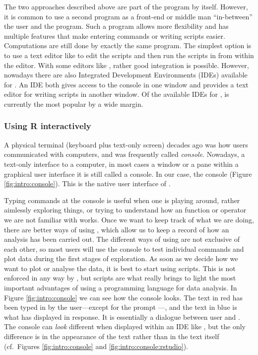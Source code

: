 \documentclass[krantz2]{krantz}\usepackage{knitr}%
\begin{document}
The two approaches described above are part of the \Rpgrm program by itself. However, it is common to use a second program as a front-end or middle man ``in-between'' the user and the \Rpgrm program. Such a program allows more flexibility and has multiple features that make entering commands or writing scripts easier. Computations are still done by exactly the same \Rpgrm program. The simplest option is to use a text editor like  to edit the scripts and then run the scripts in \Rpgrm from within the editor. With some editors like , rather good integration is possible. However, nowadays there are also Integrated Development Environments (IDEs) available for \Rpgrm. An IDE both gives access to the \Rpgrm console in one window and provides a text editor for writing scripts in another window. Of the available IDEs for \Rpgrm, \RStudio is currently the most popular by a wide margin.

\subsubsection{Using R interactively}

A physical terminal (keyboard plus text-only screen) decades ago was how users communicated with computers, and was frequently called \emph{console}. Nowadays, a text-only interface to a computer, in most cases a window or a pane within a graphical user interface it is still called a console. In our case, the \Rpgrm console (Figure \ref{fig:intro:console}). This is the native user interface of \Rpgrm.

Typing commands at the \Rpgrm console is useful when one is playing around, rather aimlessly exploring things, or trying to understand how an \Rpgrm function or operator we are not familiar with works. Once we want to keep track of what we are doing, there are better ways of using \Rpgrm, which allow us to keep a record of how an analysis has been carried out. The different ways of using \Rpgrm are not exclusive of each other, so most users will use the \Rpgrm console to test individual commands and plot data during the first stages of exploration. As soon as we decide how we want to plot or analyse the data, it is best to start using scripts. This is not enforced in any way by \Rpgrm, but scripts are what really brings to light the most important advantages of using a programming language for data analysis. In Figure \ref{fig:intro:console} we can see how the \Rpgrm console looks. The text in red has been typed in by the user---except for the prompt \code{$>$}---, and the text in blue is what \Rpgrm has displayed in response. It is essentially a dialogue between user and \Rpgrm. The console can \emph{look} different when displayed within an IDE like \RStudio, but the only difference is in the appearance of the text rather than in the text itself (cf.\ Figures \ref{fig:intro:console} and \ref{fig:intro:console:rstudio}).
\end{document}

